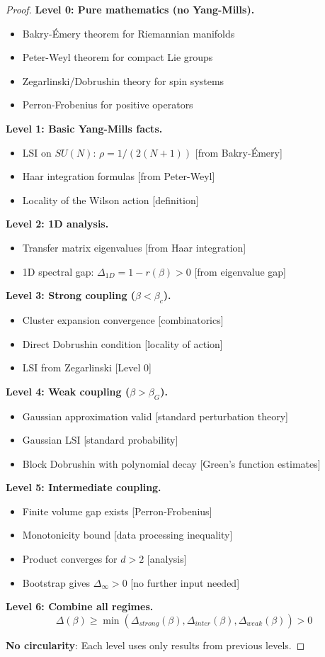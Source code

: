 \begin{proof}
\textbf{Level 0: Pure mathematics (no Yang-Mills).}
\begin{itemize}
\item Bakry-Émery theorem for Riemannian manifolds
\item Peter-Weyl theorem for compact Lie groups
\item Zegarlinski/Dobrushin theory for spin systems
\item Perron-Frobenius for positive operators
\end{itemize}

\textbf{Level 1: Basic Yang-Mills facts.}
\begin{itemize}
\item LSI on $SU(N)$: $\rho = 1/(2(N+1))$ [from Bakry-Émery]
\item Haar integration formulas [from Peter-Weyl]
\item Locality of the Wilson action [definition]
\end{itemize}

\textbf{Level 2: 1D analysis.}
\begin{itemize}
\item Transfer matrix eigenvalues [from Haar integration]
\item 1D spectral gap: $\Delta_{1D} = 1 - r(\beta) > 0$ [from eigenvalue gap]
\end{itemize}

\textbf{Level 3: Strong coupling ($\beta < \beta_c$).}
\begin{itemize}
\item Cluster expansion convergence [combinatorics]
\item Direct Dobrushin condition [locality of action]
\item LSI from Zegarlinski [Level 0]
\end{itemize}

\textbf{Level 4: Weak coupling ($\beta > \beta_G$).}
\begin{itemize}
\item Gaussian approximation valid [standard perturbation theory]
\item Gaussian LSI [standard probability]
\item Block Dobrushin with polynomial decay [Green's function estimates]
\end{itemize}

\textbf{Level 5: Intermediate coupling.}
\begin{itemize}
\item Finite volume gap exists [Perron-Frobenius]
\item Monotonicity bound [data processing inequality]
\item Product converges for $d > 2$ [analysis]
\item Bootstrap gives $\Delta_\infty > 0$ [no further input needed]
\end{itemize}

\textbf{Level 6: Combine all regimes.}
\[
\Delta(\beta) \geq \min(\Delta_{strong}(\beta), \Delta_{inter}(\beta), \Delta_{weak}(\beta)) > 0
\]

\textbf{No circularity}: Each level uses only results from previous levels.
\end{proof}

